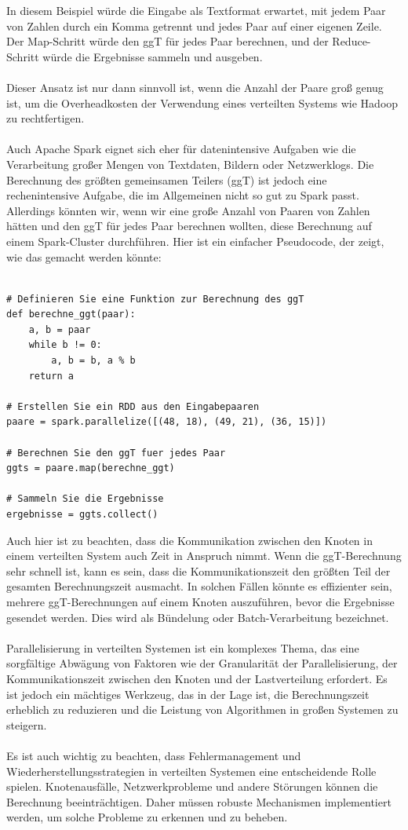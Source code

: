 In diesem Beispiel würde die Eingabe als Textformat erwartet, mit jedem Paar von Zahlen durch ein Komma getrennt und jedes Paar auf einer eigenen Zeile. Der Map-Schritt würde den ggT für jedes Paar berechnen, und der Reduce-Schritt würde die Ergebnisse sammeln und ausgeben. 
\\\\
Dieser Ansatz ist nur dann sinnvoll ist, wenn die Anzahl der Paare groß genug ist, um die Overheadkosten der Verwendung eines verteilten Systems wie Hadoop zu rechtfertigen.
\\\\
Auch Apache Spark eignet sich eher für datenintensive Aufgaben wie die Verarbeitung großer Mengen von Textdaten, Bildern oder Netzwerklogs. Die Berechnung des größten gemeinsamen Teilers (ggT) ist jedoch eine rechenintensive Aufgabe, die im Allgemeinen nicht so gut zu Spark passt.
Allerdings könnten wir, wenn wir eine große Anzahl von Paaren von Zahlen hätten und den ggT für jedes Paar berechnen wollten, diese Berechnung auf einem Spark-Cluster durchführen. Hier ist ein einfacher Pseudocode, der zeigt, wie das gemacht werden könnte:
\begin{lstlisting}[caption={RDD Spark},captionpos=b,label={lst:spark}]

# Definieren Sie eine Funktion zur Berechnung des ggT
def berechne_ggt(paar):
    a, b = paar
    while b != 0:
        a, b = b, a % b
    return a

# Erstellen Sie ein RDD aus den Eingabepaaren
paare = spark.parallelize([(48, 18), (49, 21), (36, 15)])

# Berechnen Sie den ggT fuer jedes Paar
ggts = paare.map(berechne_ggt)

# Sammeln Sie die Ergebnisse
ergebnisse = ggts.collect()
\end{lstlisting}
Auch hier ist zu beachten, dass die Kommunikation zwischen den Knoten in einem verteilten System auch Zeit in Anspruch nimmt. Wenn die ggT-Berechnung sehr schnell ist, kann es sein, dass die Kommunikationszeit den größten Teil der gesamten Berechnungszeit ausmacht. In solchen Fällen könnte es effizienter sein, mehrere ggT-Berechnungen auf einem Knoten auszuführen, bevor die Ergebnisse gesendet werden. Dies wird als Bündelung oder Batch-Verarbeitung bezeichnet.
\\\\
Parallelisierung in verteilten Systemen ist ein komplexes Thema, das eine sorgfältige Abwägung von Faktoren wie der Granularität der Parallelisierung, der Kommunikationszeit zwischen den Knoten und der Lastverteilung erfordert. Es ist jedoch ein mächtiges Werkzeug, das in der Lage ist, die Berechnungszeit erheblich zu reduzieren und die Leistung von Algorithmen in großen Systemen zu steigern.
\\\\
Es ist auch wichtig zu beachten, dass Fehlermanagement und Wiederherstellungsstrategien in verteilten Systemen eine entscheidende Rolle spielen. Knotenausfälle, Netzwerkprobleme und andere Störungen können die Berechnung beeinträchtigen. Daher müssen robuste Mechanismen implementiert werden, um solche Probleme zu erkennen und zu beheben.

